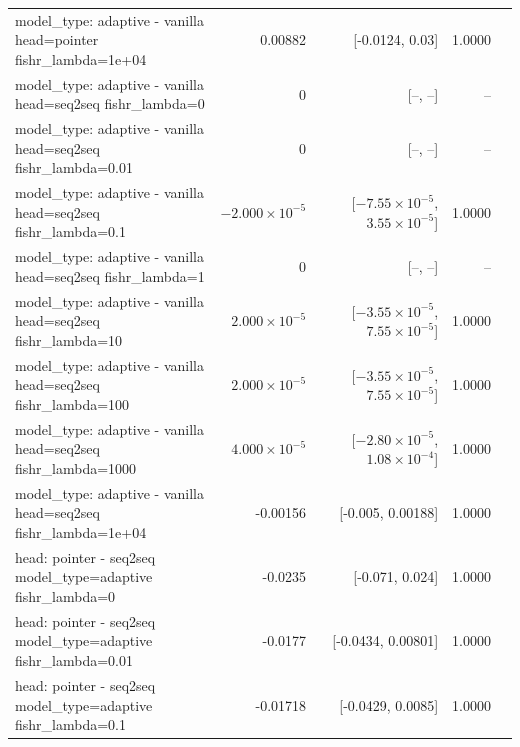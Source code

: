 \documentclass[10pt]{article}
\makeatletter
\newcommand{\stackcell}[1]{\begin{tabular}[t]{@{}l@{}}#1\end{tabular}}
\makeatother
\begin{document}
{\begin{longtable}{lrrrl}
\stackcell{model\_type: adaptive - vanilla\\\footnotesize head=pointer fishr\_lambda=1e+04 } & 0.00882 & [-0.0124, 0.03] & 1.0000 & \\
\stackcell{model\_type: adaptive - vanilla\\\footnotesize head=seq2seq fishr\_lambda=0 } & 0 & [--, --] & -- & \\
\stackcell{model\_type: adaptive - vanilla\\\footnotesize head=seq2seq fishr\_lambda=0.01 } & 0 & [--, --] & -- & \\
\stackcell{model\_type: adaptive - vanilla\\\footnotesize head=seq2seq fishr\_lambda=0.1 } & $-2.000\times10^{-5}$ & [$-7.55\times10^{-5}$, $3.55\times10^{-5}$] & 1.0000 & \\
\stackcell{model\_type: adaptive - vanilla\\\footnotesize head=seq2seq fishr\_lambda=1 } & 0 & [--, --] & -- & \\
\stackcell{model\_type: adaptive - vanilla\\\footnotesize head=seq2seq fishr\_lambda=10 } & $2.000\times10^{-5}$ & [$-3.55\times10^{-5}$, $7.55\times10^{-5}$] & 1.0000 & \\
\stackcell{model\_type: adaptive - vanilla\\\footnotesize head=seq2seq fishr\_lambda=100 } & $2.000\times10^{-5}$ & [$-3.55\times10^{-5}$, $7.55\times10^{-5}$] & 1.0000 & \\
\stackcell{model\_type: adaptive - vanilla\\\footnotesize head=seq2seq fishr\_lambda=1000 } & $4.000\times10^{-5}$ & [$-2.80\times10^{-5}$, $1.08\times10^{-4}$] & 1.0000 & \\
\stackcell{model\_type: adaptive - vanilla\\\footnotesize head=seq2seq fishr\_lambda=1e+04 } & -0.00156 & [-0.005, 0.00188] & 1.0000 & \\
\stackcell{head: pointer - seq2seq\\\footnotesize model\_type=adaptive fishr\_lambda=0 } & -0.0235 & [-0.071, 0.024] & 1.0000 & \\
\stackcell{head: pointer - seq2seq\\\footnotesize model\_type=adaptive fishr\_lambda=0.01 } & -0.0177 & [-0.0434, 0.00801] & 1.0000 & \\
\stackcell{head: pointer - seq2seq\\\footnotesize model\_type=adaptive fishr\_lambda=0.1 } & -0.01718 & [-0.0429, 0.0085] & 1.0000 & \\

\end{longtable}}
\end{document}
